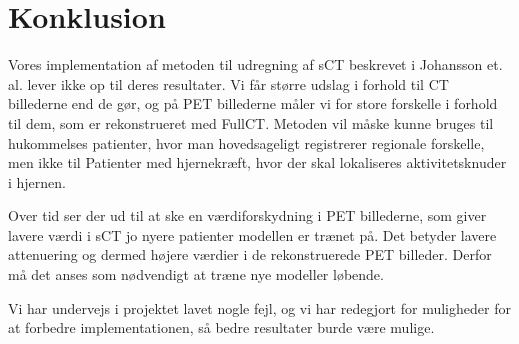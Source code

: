 \section{Konklusion}

Vores implementation af metoden til udregning af sCT beskrevet i Johansson
et. al. lever ikke op til deres resultater. Vi får større udslag i forhold
til CT billederne end de gør, og på PET billederne måler vi for store
forskelle i forhold til dem, som er rekonstrueret med FullCT.  Metoden vil
måske kunne bruges til hukommelses patienter, hvor man hovedsageligt
registrerer regionale forskelle, men ikke til Patienter med hjernekræft,
hvor der skal lokaliseres aktivitetsknuder i hjernen.

Over tid ser der ud til at ske en værdiforskydning i PET billederne, som
giver lavere værdi i sCT jo nyere patienter modellen er trænet på. Det
betyder lavere attenuering og dermed højere værdier i de rekonstruerede
PET billeder. Derfor må det anses som nødvendigt at træne nye modeller
løbende.

Vi har undervejs i projektet lavet nogle fejl, og vi har redegjort for
muligheder for at forbedre implementationen, så bedre resultater burde
være mulige.


